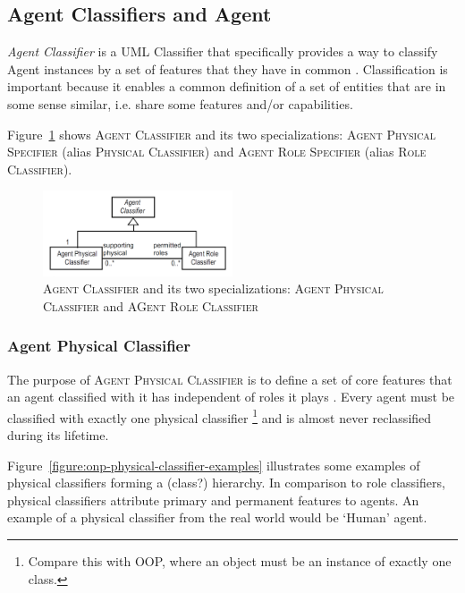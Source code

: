 \subsection{Agent Classifiers and Agent}

\textit{Agent Classifier} is a UML Classifier that specifically provides a way to classify Agent instances by a set of features that they have in common \cite{Odell05}.
Classification is important because it enables a common definition of a set of entities that are in some sense similar, i.e. share some features and/or capabilities.

Figure~\ref{figure:onp-agent-classifiers} shows \textsc{Agent Classifier} and its two specializations: \textsc{Agent Physical Specifier} (alias \textsc{Physical Classifier}) and \textsc{Agent Role Specifier} (alias \textsc{Role Classifier}).

\begin{figure}[h]
	\centering
	\includegraphics[width=0.5\textwidth]{images/onp-agent-classifiers.png}
	\caption{\textsc{Agent Classifier} and its two specializations: \textsc{Agent Physical Classifier} and \textsc{AGent Role Classifier}}
	\label{figure:onp-agent-classifiers}
\end{figure}

\subsubsection*{Agent Physical Classifier}

The purpose of \textsc{Agent Physical Classifier} is to define a set of core features that an agent classified with it has independent of roles it plays \cite{Odell05}.
Every agent must be classified with exactly one physical classifier \footnote{Compare this with OOP, where an object must be an instance of exactly one class.} and is almost never reclassified during its lifetime.

Figure~\ref{figure:onp-physical-classifier-examples} illustrates some examples of physical classifiers forming a (class?) hierarchy.
In comparison to role classifiers, physical classifiers attribute primary and permanent features to agents.
An example of a physical classifier from the real world would be `Human' agent.

